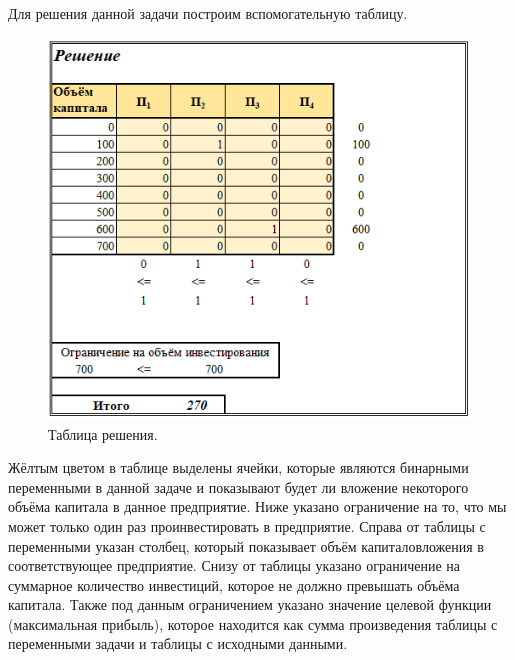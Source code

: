 Для решения данной задачи построим вспомогательную таблицу.
\begin{figure}[h]
  \centering \includegraphics[scale=0.8]{content/images/impl_investing2.png}
  \caption{Таблица решения.}
  \label{fig:impl_investing2}
\end{figure}

Жёлтым цветом в таблице выделены ячейки, которые являются бинарными переменными в данной задаче и показывают будет ли вложение некоторого объёма капитала в данное предприятие. Ниже указано ограничение на то, что мы может только один раз проинвестировать в предприятие. Справа от таблицы с переменными указан столбец, который показывает объём капиталовложения в соответствующее предприятие. Снизу от таблицы указано ограничение на суммарное количество инвестиций, которое не должно превышать объёма капитала. Также под данным ограничением указано значение целевой функции (максимальная прибыль), которое находится как сумма произведения таблицы с переменными задачи и таблицы с исходными данными.

